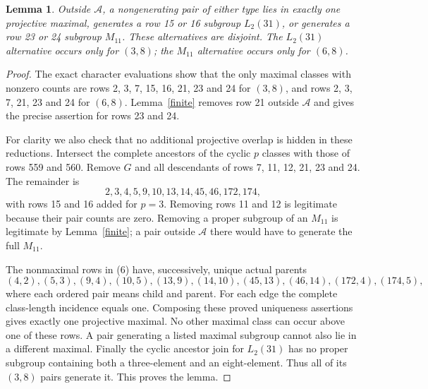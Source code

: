 \documentclass[11pt,a4paper]{article}
\newtheorem{lemma}{Lemma}\newtheorem{theorem}{Theorem}
\begin{document}
\begin{lemma}\label{outside}
Outside $\mathcal A$, a nongenerating pair of either type lies in
exactly one projective maximal, generates a row 15 or 16 subgroup
$L_2(31)$, or generates a row 23 or 24 subgroup $M_{11}$.
These alternatives are disjoint. The $L_2(31)$ alternative occurs
only for $(3,8)$; the $M_{11}$ alternative occurs only for $(6,8)$.
\end{lemma}
\begin{proof}
The exact character evaluations show that the only maximal classes
with nonzero counts are rows 2, 3, 7, 15, 16, 21, 23 and 24 for
$(3,8)$, and rows 2, 3, 7, 21, 23 and 24 for $(6,8)$.
Lemma~\ref{finite} removes row 21 outside $\mathcal A$ and gives
the precise assertion for rows 23 and 24.

For clarity we also check that no additional projective overlap is
hidden in these reductions. Intersect the complete ancestors of the
cyclic $p$ classes with those of rows 559 and 560. Remove $G$ and
all descendants of rows 7, 11, 12, 21, 23 and 24. The remainder is
\[
2,3,4,5,9,10,13,14,45,46,172,174,                             \tag{6}
\]
with rows 15 and 16 added for $p=3$. Removing rows 11 and 12 is
legitimate because their pair counts are zero. Removing a proper
subgroup of an $M_{11}$ is legitimate by Lemma~\ref{finite}; a pair
outside $\mathcal A$ there would have to generate the full $M_{11}$.

The nonmaximal rows in (6) have, successively, unique actual parents
\[
(4,2),(5,3),(9,4),(10,5),(13,9),(14,10),(45,13),(46,14),
(172,4),(174,5),                                             \tag{7}
\]
where each ordered pair means child and parent. For each edge the
complete class-length incidence equals one. Composing these proved
uniqueness assertions gives exactly one projective maximal. No other
maximal class can occur above one of these rows. A pair generating a
listed maximal subgroup cannot also lie in a different maximal.
Finally the cyclic ancestor join for $L_2(31)$ has no proper subgroup
containing both a three-element and an eight-element. Thus all of
its $(3,8)$ pairs generate it. This proves the lemma.
\end{proof}
\end{document}
